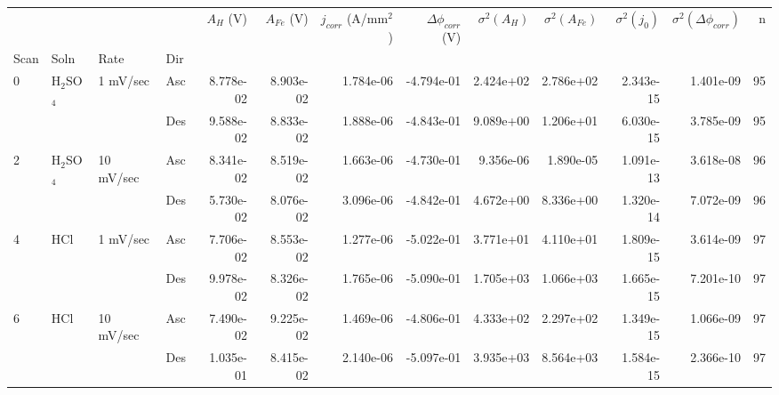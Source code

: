 \begin{tabular}{llllrrrrrrrrr}
\toprule
  &     &           &     &  $A_H$ (V) &  $A_{Fe}$ (V) &  $j_{corr}$ (A/mm$^2$) &  $\Delta \phi_{corr}$ (V) &  $\sigma^2(A_H)$ &  $\sigma^2(A_{Fe})$ &  $\sigma^2(j_0)$ &  $\sigma^2(\Delta \phi_{corr})$ &   n \\
Scan & Soln & Rate & Dir &            &               &                        &                           &                  &                     &                  &                                 &     \\
\midrule
0 & H$_2$SO$_4$ & 1 mV/sec & Asc &  8.778e-02 &     8.903e-02 &              1.784e-06 &                -4.794e-01 &        2.424e+02 &           2.786e+02 &        2.343e-15 &                       1.401e-09 &  95 \\
  &     &           & Des &  9.588e-02 &     8.833e-02 &              1.888e-06 &                -4.843e-01 &        9.089e+00 &           1.206e+01 &        6.030e-15 &                       3.785e-09 &  95 \\
2 & H$_2$SO$_4$ & 10 mV/sec & Asc &  8.341e-02 &     8.519e-02 &              1.663e-06 &                -4.730e-01 &        9.356e-06 &           1.890e-05 &        1.091e-13 &                       3.618e-08 &  96 \\
  &     &           & Des &  5.730e-02 &     8.076e-02 &              3.096e-06 &                -4.842e-01 &        4.672e+00 &           8.336e+00 &        1.320e-14 &                       7.072e-09 &  96 \\
4 & HCl & 1 mV/sec & Asc &  7.706e-02 &     8.553e-02 &              1.277e-06 &                -5.022e-01 &        3.771e+01 &           4.110e+01 &        1.809e-15 &                       3.614e-09 &  97 \\
  &     &           & Des &  9.978e-02 &     8.326e-02 &              1.765e-06 &                -5.090e-01 &        1.705e+03 &           1.066e+03 &        1.665e-15 &                       7.201e-10 &  97 \\
6 & HCl & 10 mV/sec & Asc &  7.490e-02 &     9.225e-02 &              1.469e-06 &                -4.806e-01 &        4.333e+02 &           2.297e+02 &        1.349e-15 &                       1.066e-09 &  97 \\
  &     &           & Des &  1.035e-01 &     8.415e-02 &              2.140e-06 &                -5.097e-01 &        3.935e+03 &           8.564e+03 &        1.584e-15 &                       2.366e-10 &  97 \\
\bottomrule
\end{tabular}
